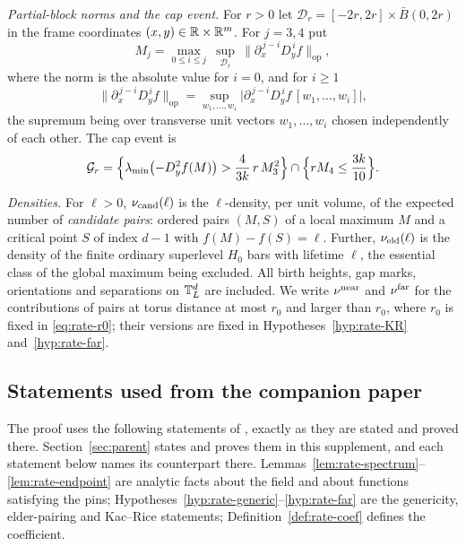 \emph{Partial-block norms and the cap event.} For $r>0$ let $\mathcal D_r=[-2r,2r]\times\bar B(0,2r)$ in the frame coordinates $(x,y)\in\mathbb R\times\mathbb R^m$. For $j=3,4$ put
\begin{equation}\label{eq:rate-Mj}
M_j=\max_{0\le i\le j}\ \sup_{\mathcal D_r}\ \bigl\|\partial_x^{\,j-i}D_y^{\,i}f\bigr\|_{\mathrm{op}},
\end{equation}
where the norm is the absolute value for $i=0$, and for $i\ge1$
\[
\bigl\|\partial_x^{\,j-i}D_y^{\,i}f\bigr\|_{\mathrm{op}}=\sup_{w_1,\dots,w_i}\bigl|\partial_x^{\,j-i}D_y^{\,i}f\,[w_1,\dots,w_i]\bigr|,
\]
the supremum being over transverse unit vectors $w_1,\dots,w_i$ chosen independently of each other. The cap event is
\begin{equation}\label{eq:rate-G}
\mathcal G_r=\Bigl\{\lambda_{\min}\bigl(-D_y^2f(M)\bigr)>\frac4{3k}\,r\,M_3^2\Bigr\}\cap\Bigl\{rM_4\le\frac{3k}{10}\Bigr\}.
\end{equation}

\emph{Densities.} For $\ell>0$, $\nu_{\mathrm{cand}}(\ell)$ is the $\ell$-density, per unit volume, of the expected number of \emph{candidate pairs}: ordered pairs $(M,S)$ of a local maximum $M$ and a critical point $S$ of index $d-1$ with $f(M)-f(S)=\ell$. Further, $\nu_{\mathrm{eld}}(\ell)$ is the density of the finite ordinary superlevel $H_0$ bars with lifetime $\ell$, the essential class of the global maximum being excluded. All birth heights, gap marks, orientations and separations on $\mathbb T^d_L$ are included. We write $\nu^{\rm near}$ and $\nu^{\rm far}$ for the contributions of pairs at torus distance at most $r_0$ and larger than $r_0$, where $r_0$ is fixed in \eqref{eq:rate-r0}; their versions are fixed in Hypotheses~\ref{hyp:rate-KR} and~\ref{hyp:rate-far}.

\subsection*{Statements used from the companion paper}

The proof uses the following statements of \cite{parentP}, exactly as they are stated and proved there. Section~\ref{sec:parent} states and proves them in this supplement, and each statement below names its counterpart there. Lemmas~\ref{lem:rate-spectrum}--\ref{lem:rate-endpoint} are analytic facts about the field and about functions satisfying the pins; Hypotheses~\ref{hyp:rate-generic}--\ref{hyp:rate-far} are the genericity, elder-pairing and Kac--Rice statements; Definition~\ref{def:rate-coef} defines the coefficient.

